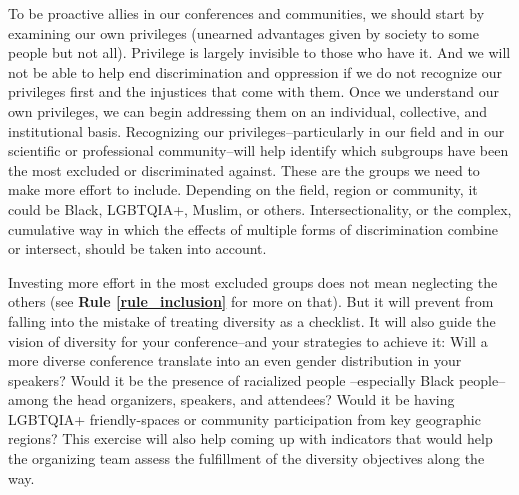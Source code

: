\documentclass[10pt,letterpaper]{article}
\begin{document}
To be proactive allies in our conferences and communities, we should start by examining our own privileges (unearned advantages given by society to some people but not all).
Privilege is largely invisible to those who have it. And we will not be able to help end discrimination and oppression if we do not recognize our privileges first and the injustices that come with them.
Once we understand our own privileges, we can begin addressing them on an individual, collective, and institutional basis.
Recognizing our privileges--particularly in our field and in our scientific or professional community--will help identify which subgroups have been the most excluded or discriminated against. 
These are the groups we need to make more effort to include. 
Depending on the field, region or community, it could be Black, LGBTQIA+, Muslim, or others. 
Intersectionality, or the complex, cumulative way in which the effects of multiple forms of discrimination combine or intersect, should be taken into account. 

Investing more effort in the most excluded groups does not mean neglecting the others (see \textbf{Rule \ref{rule_inclusion}} for more on that). 
But it will prevent from falling into the mistake of treating diversity as a checklist.
It will also guide the vision of diversity for your conference--and your strategies to achieve it:
Will a more diverse conference translate into an even gender distribution in your speakers? 
Would it be the presence of racialized people --especially Black people-- among the head organizers, speakers, and attendees? 
Would it be having LGBTQIA+ friendly-spaces or community participation from key geographic regions?
This exercise will also help coming up with indicators that would help the organizing team assess the fulfillment of the diversity objectives along the way. 

\end{document}
